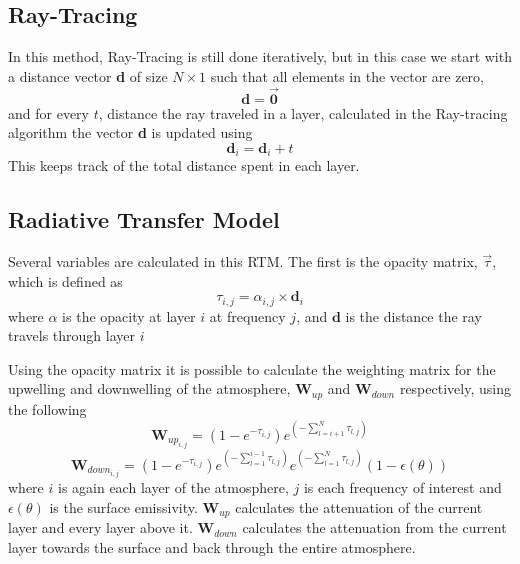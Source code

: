 \subsection{Ray-Tracing}
In this method, Ray-Tracing is still done iteratively, but in this case we start with a distance vector \textbf{d} of size $N \times 1$ such that all elements in the vector are zero,
\begin{equation*}
\textbf{d} = \vec{\textbf{0}}
\end{equation*}
and for every $t$, distance the ray traveled in a layer, calculated in the Ray-tracing algorithm the vector \textbf{d} is updated using
\begin{equation}
\textbf{d}_i = \textbf{d}_i + t 
\end{equation}
This keeps track of the total distance spent in each layer.

\subsection{Radiative Transfer Model}

Several variables are calculated in this RTM. The first is the opacity matrix, $\vec{\tau}$, which is defined as
\begin{equation}
\tau_{i,j} = \alpha_{i,j} \times \textbf{d}_i
\end{equation}
where $\alpha$ is the opacity at layer $i$ at frequency $j$, and $\textbf{d}$ is the distance the ray travels through layer $i$

Using the opacity matrix it is possible to calculate the weighting matrix for the upwelling and downwelling of the atmosphere, $\textbf{W}_{up}$ and $\textbf{W}_{down}$ respectively, using the following
\begin{equation}
\textbf{W}_{up_{i,j}} = (1-e^{-\tau_{i,j}})e^{\left(-\sum_{l=i+1}^N \tau_{l,j}\right)}
\end{equation}
\begin{equation}
\textbf{W}_{down_{i,j}} = (1-e^{-\tau_{i,j}})e^{\left(-\sum_{l=1}^{i-1} \tau_{l,j}\right)} e^{\left(-\sum_{l=1}^{N} \tau_{l,j}\right)} (1- \epsilon(\theta))
\end{equation}
where $i$ is again each layer of the atmosphere, $j$ is each frequency of interest and $\epsilon(\theta)$ is the surface emissivity. $\textbf{W}_{up}$ calculates the attenuation of the current layer and every layer above it. $\textbf{W}_{down}$ calculates the attenuation from the current layer towards the surface and back through the entire atmosphere. 

